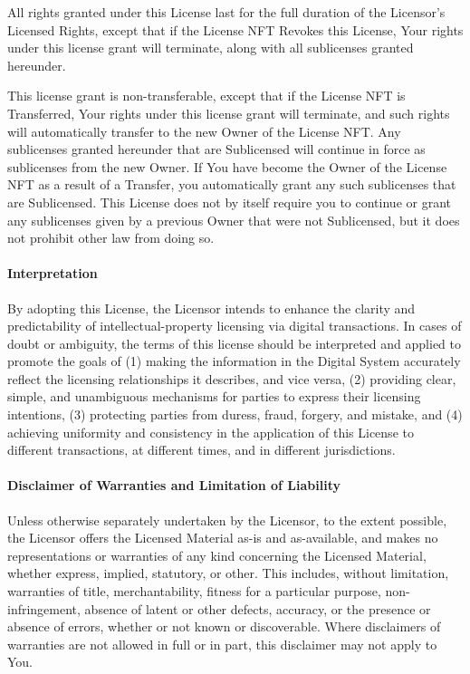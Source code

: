 \documentclass{article}
\begin{document}
All rights granted under this License last for the full duration of the Licensor's Licensed Rights, except that if the License NFT Revokes this License, Your rights under this license grant will terminate, along with all sublicenses granted hereunder. 

This license grant is non-transferable, except that if the License NFT is Transferred, Your rights under this license grant will terminate, and such rights will automatically transfer to the new Owner of the License NFT. Any sublicenses granted hereunder that are Sublicensed will continue in force as sublicenses from the new Owner. If You have become the Owner of the License NFT as a result of a Transfer, you automatically grant any such sublicenses that are Sublicensed. This License does not by itself require you to continue or grant any sublicenses given by a previous Owner that were not Sublicensed, but it does not prohibit other law from doing so.




\paragraph{Interpretation}

By adopting this License, the Licensor intends to enhance the clarity and predictability of intellectual-property licensing via digital transactions. In cases of doubt or ambiguity, the terms of this license should be interpreted and applied to promote the goals of (1) making the information in the Digital System accurately reflect the licensing relationships it describes, and vice versa, (2) providing clear, simple, and unambiguous mechanisms for parties to express their licensing intentions, (3) protecting parties from duress, fraud, forgery, and mistake, and (4) achieving uniformity and consistency in the application of this License to different transactions, at different times, and in different jurisdictions.




\paragraph{Disclaimer of Warranties and Limitation of Liability}

Unless otherwise separately undertaken by the Licensor, to the extent possible, the Licensor offers the Licensed Material as-is and as-available, and makes no representations or warranties of any kind concerning the Licensed Material, whether express, implied, statutory, or other. This includes, without limitation, warranties of title, merchantability, fitness for a particular purpose, non-infringement, absence of latent or other defects, accuracy, or the presence or absence of errors, whether or not known or discoverable. Where disclaimers of warranties are not allowed in full or in part, this disclaimer may not apply to You.
\end{document}
